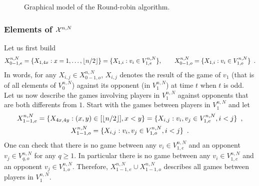 \begin{figure}[h!]
\caption{Graphical model of the Round-robin algorithm.}
\label{fig:robin:graphicalmodel}
\end{figure}

\subsubsection{Elements of $\mathcal{X}^{n,N}$}

Let us first build 
\[
X_{0-1,e}^{n,N}=\{X_{1,4x} : x=1,\ldots,\left\lfloor n/2\right\rfloor\}=\{X_{1,i} : v_i\in V_{1,e}^{n,N}\},\qquad X_{0-1,o}^{n,N}=\{X_{1,i} : v_i\in V_{1,o}^{n,N}\}\enspace.
\]
In words, for any $X_{i,j}\in X_{0-1,o}^{n,N}$, $X_{i,j}$ denotes the result of the game of $v_1$ (that is of all elements of $V_{0}^{n,N}$) against its opponent (in $V_{1}^{n,N}$) at time $t$ when $t$ is odd. Let us now describe the games involving players in $V_{1}^{n,N}$ against opponents that are both differents from $1$. Start with the games between players in $V_{1}^{n,N}$ and let 
\begin{gather*}
X_{1-1,e}^{n,N}=\{X_{4x,4y} : (x,y)\in [\left\lfloor n/2\right\rfloor], x< y\}=\{X_{i,j} : v_i,v_j\in V_{1,e}^{n,N},i<j\}\enspace,\\
X_{1-1,o}^{n,N}=\{X_{i,j} : v_i,v_j\in V_{1,o}^{n,N},i<j\}\enspace. 
\end{gather*}
One can check that there is no game between any $v_i\in V_{1,e}^{n,N}$ and an opponent $v_j\in V_{q,o}^{n,N}$ for any $q\ge 1$. 
In particular there is no game between any $v_i\in V_{1,e}^{n,N}$ and an opponent $v_j\in V_{1,o}^{n,N}$.  Therefore, $X_{1-1,e}^{n,N}\cup X_{1-1,o}^{n,N}$ describes all games between players in $V_{1}^{n,N}$. 

